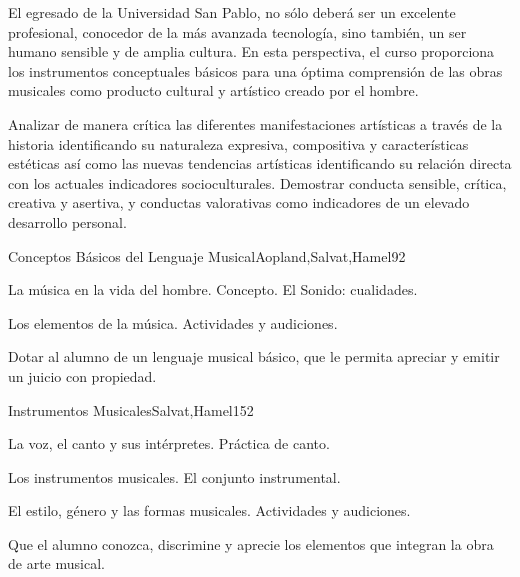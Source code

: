 \begin{syllabus}


\begin{justification}
El egresado de la Universidad San Pablo, no sólo deberá ser un excelente profesional, conocedor de la más avanzada tecnología, sino también, un ser humano sensible y de amplia cultura. En esta perspectiva, el curso proporciona los instrumentos conceptuales básicos para una óptima comprensión de las obras musicales como producto cultural y artístico creado por el hombre.
\end{justification}

\begin{goals}
\item Analizar de manera crítica las diferentes manifestaciones artísticas a través de la historia identificando su naturaleza expresiva, compositiva y características estéticas así como las nuevas tendencias artísticas identificando su relación directa con los actuales indicadores socioculturales. Demostrar conducta sensible, crítica, creativa y asertiva, y conductas valorativas como indicadores de un elevado desarrollo personal.
\end{goals}

\begin{outcomes}
\end{outcomes}

\begin{unit}{Conceptos Básicos del Lenguaje Musical}{Aopland,Salvat,Hamel}{9}{2}
\begin{topics}
	\item La música en la vida del hombre. Concepto. El Sonido: cualidades.
	\item Los elementos de la música. Actividades y audiciones.
\end{topics}
\begin{unitgoals}
	\item Dotar al alumno de un lenguaje musical básico, que le permita apreciar y emitir un juicio con propiedad.
\end{unitgoals}
\end{unit}

\begin{unit}{Instrumentos Musicales}{Salvat,Hamel}{15}{2}
\begin{topics}
	\item La voz, el canto y sus intérpretes. Práctica de canto.
	\item Los instrumentos musicales. El conjunto instrumental.
	\item El estilo, género y las formas musicales. Actividades y audiciones.
\end{topics}
\begin{unitgoals}
	\item Que el alumno conozca, discrimine y aprecie los elementos que integran la obra de arte musical.
\end{unitgoals}
\end{unit}


\end{syllabus}
